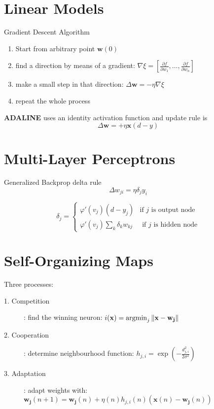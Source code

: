 \documentclass[11pt]{article}
\newcommand{\argmin}{\operatornamewithlimits{argmin}}
\begin{document}
\section{Linear Models}
Gradient Descent Algorithm
\begin{enumerate}
	\item Start from arbitrary point $\mathbf{w}(0)$
	\item find a direction by means of a gradient: $\nabla\xi = [\frac{\partial f}{\partial w_1}, \dots, \frac{\partial f}{\partial w_n}]$
	\item make a small step in that direction: $\Delta\mathbf{w} = -\eta\nabla\xi$
	\item repeat the whole process
\end{enumerate}
\textbf{ADALINE} uses an identity activation function and update rule is
$$\Delta\mathbf{w} = + \eta\mathbf{x}(d-y)$$

\section{Multi-Layer Perceptrons}
Generalized Backprop delta rule
$$
\Delta w_{ji} = \eta \delta_j y_i
$$

$$
\delta_j = \begin{cases} \varphi '(v_j)(d-y_j) & \mbox{if }j\mbox{ is output node} \\
 \varphi '(v_j)\sum_{k} \delta_k w_{kj} & \mbox{ if }j\mbox{ is hidden node} \end{cases}
$$

\section{Self-Organizing Maps}
Three processes:
\begin{description}
	\item[1. Competition]: find the winning neuron: $i(\mathbf{x})=\argmin_j \Vert \mathbf{x}-\mathbf{w_j}\Vert$
	\item[2. Cooperation]: determine neighbourhood function: $h_{j,i} = \exp(-\frac{d_{j,i}^2}{2\sigma^2})$
	\item[3. Adaptation]: adapt weights with:\\
	$\mathbf{w_j}(n+1) = \mathbf{w_j}(n)+\eta(n)h_{j,i}(n)(\mathbf{x}(n)-\mathbf{w_j}(n))$
\end{description}
\end{document}

